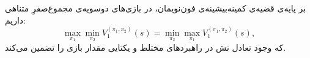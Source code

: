 بر پایه‌ی قضیه‌ی کمینه‌بیشینه‌ی فون‌نویمان، در بازی‌های دوسویه‌ی مجموع‌صفرِ متناهی داریم:
\[
\max_{\pi_1}\min_{\pi_2} V_1^{(\pi_1,\pi_2)}(s)
=
\min_{\pi_2}\max_{\pi_1} V_1^{(\pi_1,\pi_2)}(s),
\]
که وجود تعادل نش در راهبردهای مختلط و یکتایی مقدار بازی را تضمین می‌کند.

